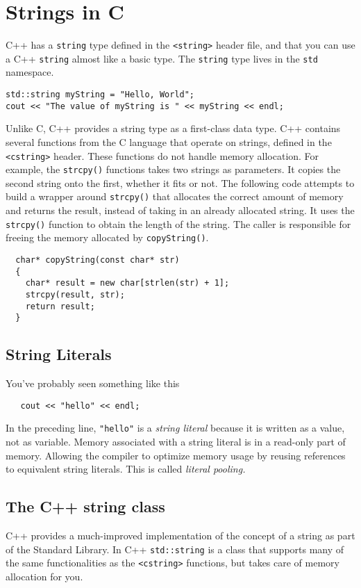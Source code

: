 \documentclass{article}
\begin{document}
\section{Strings in C}
C++ has a \texttt{string} type defined in the \texttt{<string>} header file, and that you
can use a C++ \texttt{string} almost like a basic type. The \texttt{string} type lives in the
\texttt{std} namespace.
\begin{verbatim}
std::string myString = "Hello, World";
cout << "The value of myString is " << myString << endl;
\end{verbatim}

Unlike C, C++ provides a string type as a first-class data type. C++ contains several functions
from the C language that operate on strings, defined in the \texttt{<cstring>} header. These functions
do not handle memory allocation. For example, the \texttt{strcpy()} functions takes two strings as
parameters. It copies the second string onto the first, whether it fits or not. The following code
attempts to build a wrapper around \texttt{strcpy()} that allocates the correct amount of memory
and returns the result, instead of taking in an already allocated string. It uses the \texttt{strcpy()}
function to obtain the length of the string. The caller is responsible for freeing the memory allocated
by \texttt{copyString()}.
\begin{verbatim}
  char* copyString(const char* str)
  {
    char* result = new char[strlen(str) + 1];
    strcpy(result, str);
    return result;
  }
\end{verbatim}

\subsection{String Literals}
You've probably seen something like this
\begin{verbatim}
   cout << "hello" << endl;
\end{verbatim}
In the preceding line, \texttt{"hello"} is a \textit{string literal} because it is written as a value,
not as variable. Memory associated with a string literal is in a read-only part of memory. Allowing
the compiler to optimize memory usage by reusing references to equivalent string literals. This is
called \textit{literal pooling.}

\subsection{The C++ string class}
C++ provides a much-improved implementation of the concept of a string as part of the Standard Library.
In C++ \texttt{std::string} is a class that supports many of the same functionalities as the \texttt{<cstring>}
functions, but takes care of memory allocation for you.
\end{document}
